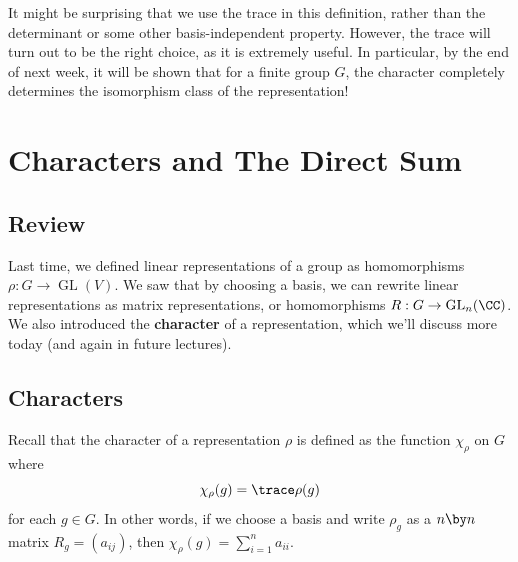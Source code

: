 It might be surprising that we use the trace in this definition, rather than the determinant or some other basis-independent property. However, the trace will turn out to be the right choice, as it is extremely useful. In particular, by the end of next week, it will be shown that for a finite group $G$, the character completely determines the isomorphism class of the representation!





\section{Characters and The Direct Sum}

\subsection{Review}

Last time, we defined linear representations of a group as homomorphisms $\rho: G \to \operatorname{GL}(V)$. We saw that by choosing a basis, we can rewrite linear representations as matrix representations, or homomorphisms $R: G \to \operatorname{GL}_n(\CC)$. We also introduced the \textbf{character} of a representation, which we'll discuss more today (and again in future lectures). 

\subsection{Characters}


Recall that the character of a representation $\rho$ is defined as the function $\chi_\rho$ on $G$ where \[\chi_\rho(g) = \trace \rho(g)\] for each $g \in G$. In other words, if we choose a basis and write $\rho_g$ as a $n \by n$ matrix $R_g = (a_{ij})$, then $\chi_\rho(g) = \sum_{i = 1}^{n} a_{ii}$.

